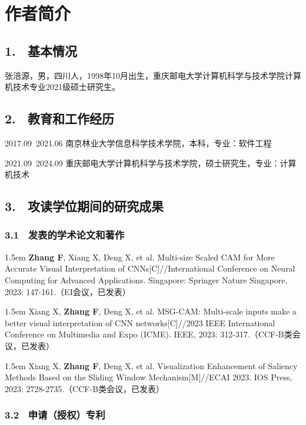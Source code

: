\specialsectioning


\chapter{作者简介}
\thispagestyle{others}
\pagestyle{others}
\xiaosi

\section{1. \ 基本情况}
张涪源，男，四川人，1998年10月出生，重庆邮电大学计算机科学与技术学院计算机技术专业2021级硕士研究生。

\section{2. \ 教育和工作经历}



2017.09~2021.06 南京林业大学信息科学技术学院，本科，专业：软件工程

2021.09~2024.09 重庆邮电大学计算机科学与技术学院，硕士研究生，专业：计算机技术

\section{3. \ 攻读学位期间的研究成果}

\subsection{3.1 \ 发表的学术论文和著作}
\hangindent 1.5em
\noindent
[1] \textbf{Zhang F}, Xiang X, Deng X, et al. Multi-size Scaled CAM for More Accurate Visual Interpretation of CNNs[C]//International Conference on Neural Computing for Advanced Applications. Singapore: Springer Nature Singapore, 2023: 147-161.（EI会议，已发表）

\hangindent 1.5em
\noindent
[2] Xiang X, \textbf{Zhang F}, Deng X, et al. MSG-CAM: Multi-scale inputs make a better visual interpretation of CNN networks[C]//2023 IEEE International Conference on Multimedia and Expo (ICME). IEEE, 2023: 312-317.（CCF-B类会议，已发表）

\hangindent 1.5em
\noindent
[3] Xiang X, \textbf{Zhang F}, Deng X, et al. Visualization Enhancement of Saliency Methods Based on the Sliding Window Mechanism[M]//ECAI 2023. IOS Press, 2023: 2728-2735.（CCF-B类会议，已发表）

\subsection{3.2 \ 申请（授权）专利}

